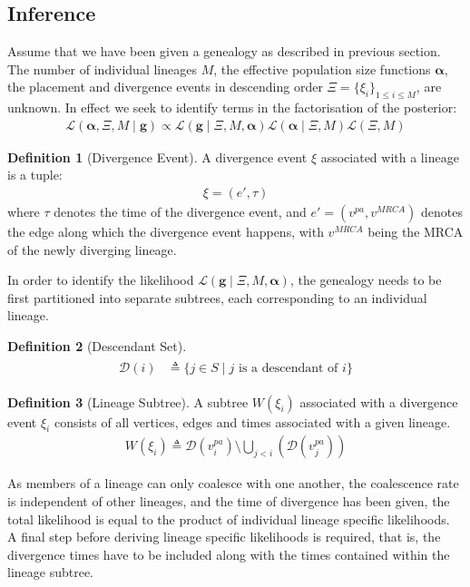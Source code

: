 \documentclass{report}
\theoremstyle{definition}
\newtheorem{definition}{Definition}[section]
\begin{document}
\subsection{Inference}
Assume that we have been given a genealogy as described in previous section. The number of individual lineages $M$, the effective population size functions $\mathbf{\alpha}$, the placement and divergence events in descending order $\Xi =\{\xi_i\}_{1\leq i\leq M}$, are unknown. In effect we seek to identify terms in the factorisation of the posterior:
\begin{gather}
\mathcal{L}(\mathbf{\alpha}, \Xi, M\mid\mathbf{g}) \propto 
\mathcal{L}(\mathbf{g}\mid \Xi, M, \mathbf{\alpha})\mathcal{L}(\mathbf{\alpha}\mid\Xi,M)\mathcal{L}(\Xi,M)
\end{gather}

\begin{definition}[Divergence Event] A divergence event $\xi$ associated with a lineage is a tuple:
\begin{gather}
\xi=\left(e', \tau\right)
\end{gather}
where $\tau$ denotes the time of the divergence event, and $e' = (v^{pa}, v^{MRCA})$ denotes the edge along which the divergence event happens, with $v^{MRCA}$ being the MRCA of the newly diverging lineage.
\end{definition}
In order to identify the likelihood $\mathcal{L}(\mathbf{g}\mid \Xi, M, \mathbf{\alpha})$, the genealogy needs to be first partitioned into separate subtrees, each corresponding to an individual lineage.

\begin{definition}[Descendant Set]
\begin{gather}
\begin{aligned}
\mathcal{D}(i) &\triangleq \{j\in S\mid j \text{ is a descendant of } i\}
\end{aligned}
\end{gather} 
\end{definition}

\begin{definition}[Lineage Subtree]
A subtree $W(\xi_i)$ associated with a divergence event $\xi_i$ consists of all vertices, edges and times associated with a given lineage.
\begin{gather}
W(\xi_i) \triangleq \mathcal{D}(v^{pa}_i) \setminus \bigcup_{j<i}(\mathcal{D}(v^{pa}_j))
\end{gather} 
\end{definition}
As members of a lineage can only coalesce with one another, the coalescence rate is independent of other lineages, and the time of divergence has been given, the total likelihood is equal to the product of individual lineage specific likelihoods.\\
A final step before deriving lineage specific likelihoods is required, that is, the divergence times have to be included along with the times contained within the lineage subtree.\\
\end{document}

